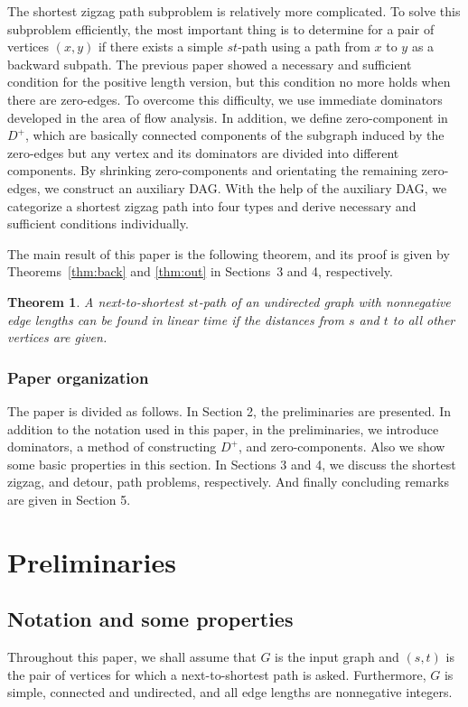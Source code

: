 \documentclass[review]{elsarticle}
\newtheorem{thm}{Theorem}
\begin{document}
The shortest zigzag path subproblem is relatively more complicated.
To solve this subproblem efficiently, the most important thing is to
determine for a pair of vertices $(x,y)$ if there exists a simple
$st$-path using a path from $x$ to $y$ as a backward subpath. The
previous paper \cite{wu10} showed a necessary and sufficient
condition for the positive length version, but this condition no
more holds when there are zero-edges. To overcome this difficulty,
we use immediate dominators developed in the area of flow analysis.
In addition, we define zero-component in $D^+$, which are basically
connected components of the subgraph induced by the zero-edges but
any vertex and its dominators are divided into different components.
By shrinking zero-components and orientating the remaining
zero-edges, we construct an auxiliary DAG. With the help of the
auxiliary DAG, we categorize a shortest zigzag path into four types
and derive necessary and sufficient conditions individually.

The main result of this paper is the following theorem, and its
proof is given by Theorems~\ref{thm:back} and \ref{thm:out} in
Sections~3 and 4, respectively.
\begin{thm}\label{thm:main}
A next-to-shortest $st$-path of an undirected graph with nonnegative
edge lengths can be found in linear time if the distances from $s$
and $t$ to all other vertices are given.
\end{thm}

\subsubsection*{Paper organization}
The paper is divided as follows. In Section 2, the preliminaries are
presented. In addition to the notation used in this paper, in the
preliminaries, we introduce dominators, a method of constructing
$D^+$, and zero-components. Also we show some basic properties in
this section. In Sections 3 and 4, we discuss the shortest zigzag,
and detour, path problems, respectively. And finally concluding
remarks are given in Section 5.

\section{Preliminaries}
\subsection{Notation and some properties}
Throughout this paper, we shall assume that $G$ is the input graph
and $(s,t)$ is the pair of vertices for which a next-to-shortest
path is asked. Furthermore, $G$ is simple, connected and undirected,
and all edge lengths are nonnegative integers.
\end{document}
